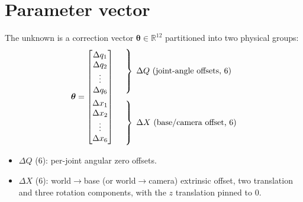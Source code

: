 \documentclass[11pt]{article}
\newcommand{\R}{\mathbb{R}}
\begin{document}
\section{Parameter vector}
The unknown is a correction vector $\bm{\theta} \in \R^{12}$ partitioned into two
physical groups:
\begin{equation}
\bm{\theta} =
\begin{bmatrix}
\Delta q_1 \\ \Delta q_2 \\ \vdots \\ \Delta q_6 \\[4pt]
\Delta x_1 \\ \Delta x_2 \\ \vdots \\ \Delta x_6
\end{bmatrix}
\quad
\begin{aligned}
&\left.\vphantom{\begin{matrix}\Delta q_1\\\Delta q_2\\\vdots\\\Delta q_6\end{matrix}}\right\}\;
   \Delta Q\ \text{(joint-angle offsets, 6)} \\[4pt]
&\left.\vphantom{\begin{matrix}\Delta x_1\\\Delta x_2\\\vdots\\\Delta x_6\end{matrix}}\right\}\;
   \Delta X\ \text{(base/camera offset, 6)}
\end{aligned}
\end{equation}
\begin{itemize}
  \item $\Delta Q$ (6): per-joint angular zero offsets.
  \item $\Delta X$ (6): world$\to$base (or world$\to$camera) extrinsic offset, two
        translation and three rotation components, with the $z$ translation pinned
        to $0$.
\end{itemize}
\end{document}
